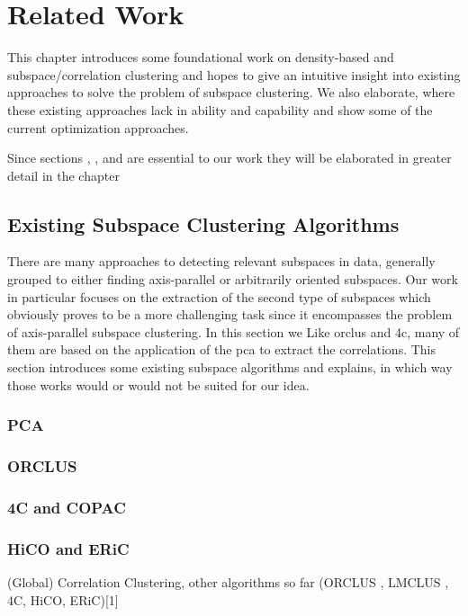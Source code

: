 \chapter{Related Work}
\label{sec:Related Work}
This chapter introduces some foundational work on density-based and subspace/correlation clustering and hopes to give an intuitive insight into existing approaches to solve the problem of subspace clustering. We also elaborate, where these existing approaches lack in ability and capability and show some of the current optimization approaches.

Since sections , ,  and  are essential to our work they will be elaborated in greater detail in the chapter 

\section{Existing Subspace Clustering Algorithms}
There are many approaches to detecting relevant subspaces in data, generally grouped to either finding axis-parallel or arbitrarily oriented subspaces. Our work in particular focuses on the extraction of the second type of subspaces which obviously proves to be a more challenging task since it encompasses the problem of axis-parallel subspace clustering. In this section we Like \acrshort{orclus} and \acrshort{4c}, many of them are based on the application of the \gls{pca} to extract the correlations. This section introduces some existing subspace algorithms and explains, in which way those works would or would not be suited for our idea.

\subsection{PCA}

\subsection{ORCLUS}

\subsection{4C and COPAC}

\subsection{HiCO and ERiC}
(Global) Correlation Clustering, other algorithms so far (ORCLUS \cite{orclusaggarwal2000finding}, LMCLUS \cite{}, 4C, HiCO, ERiC)[1]

